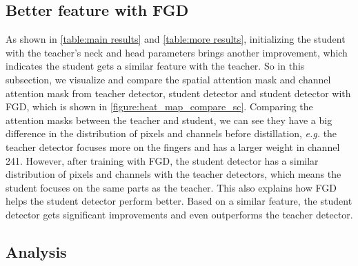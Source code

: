 \documentclass[10pt,twocolumn,letterpaper]{article}
\begin{document}
\subsection{Better feature with FGD}
As shown in \cref{table:main results} and \cref{table:more results}, initializing the student with the teacher's neck and head parameters brings another improvement, which indicates the student gets a similar feature with the teacher. So in this subsection, we visualize and compare the spatial attention mask and channel attention mask from teacher detector, student detector and student detector with FGD, which is shown in \cref{figure:heat_map_compare_sc}. Comparing the attention masks between the teacher and student, we can see they have a big difference in the distribution of pixels and channels before distillation, {\em e.g.} the teacher detector focuses more on the fingers and has a larger weight in channel 241. However, after training with FGD, the student detector has a similar distribution of pixels and channels with the teacher detectors, which means the student focuses on the same parts as the teacher. This also explains how FGD helps the student detector perform better. Based on a similar feature, the student detector gets significant improvements and even outperforms the teacher detector.

\subsection{Analysis}
\end{document}
